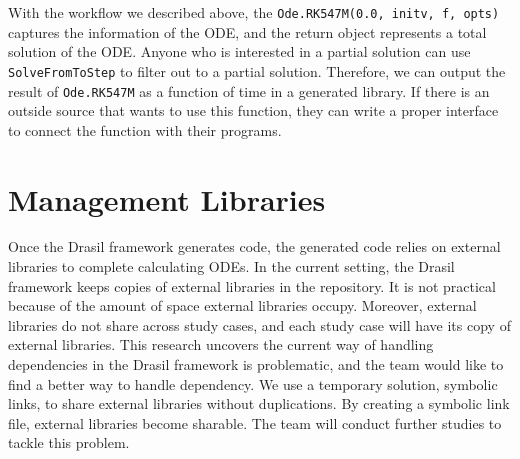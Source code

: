 With the workflow we described above, the \verb|Ode.RK547M(0.0, initv, f, opts)| captures the information of the ODE, and the return object represents a total solution of the ODE. Anyone who is interested in a partial solution can use \verb|SolveFromToStep| to filter out to a partial solution. Therefore,
we can output the result of \verb|Ode.RK547M| as a function of time in a generated library. If there is an outside source that wants to use this function, they can write a proper interface to connect the function with their programs. 

\section{Management Libraries}
Once the Drasil framework generates code, the generated code relies on external libraries to complete calculating ODEs. In the current setting, the Drasil framework keeps copies of external libraries in the repository. It is not practical because of the amount of space external libraries occupy. Moreover, external libraries do not share across study cases, and each study case will have its copy of external libraries. This research uncovers the current way of handling dependencies in the Drasil framework is problematic, and the team would like to find a better way to handle dependency. We use a temporary solution, symbolic links, to share external libraries without duplications. By creating a symbolic link file, external libraries become sharable. The team will conduct further studies to tackle this problem.
